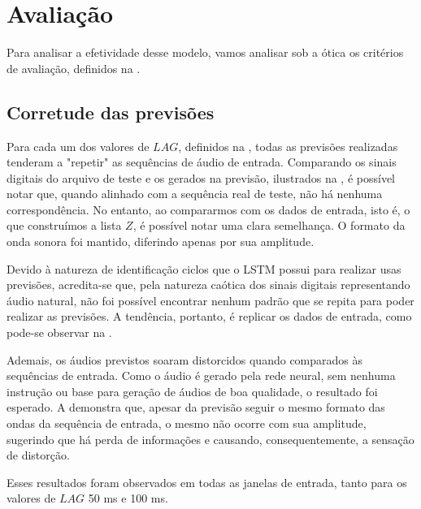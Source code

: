 \section{Avaliação}

Para analisar a efetividade desse modelo, vamos analisar sob a ótica os critérios de avaliação, definidos na .

\subsection{Corretude das previsões}

Para cada um dos valores de $LAG$, definidos na , todas as previsões realizadas tenderam a "repetir" as sequências de áudio de entrada. Comparando os sinais digitais do arquivo de teste e os gerados na previsão, ilustrados na , é possível notar que, quando alinhado com a sequência real de teste, não há nenhuma correspondência. No entanto, ao compararmos com os dados de entrada, isto é, o que construímos a lista $Z$, é possível notar uma clara semelhança. O formato da onda sonora foi mantido, diferindo apenas por sua amplitude.

Devido à natureza de identificação ciclos que o LSTM possui para realizar usas previsões, acredita-se que, pela natureza caótica dos sinais digitais representando áudio natural, não foi possível encontrar nenhum padrão que se repita para poder realizar as previsões. A tendência, portanto, é replicar os dados de entrada, como pode-se observar na .

Ademais, os áudios previstos soaram distorcidos quando comparados às sequências de entrada. Como o áudio é gerado pela rede neural, sem nenhuma instrução ou base para geração de áudios de boa qualidade, o resultado foi esperado. A  demonstra que, apesar da previsão seguir o mesmo formato das ondas da sequência de entrada, o mesmo não ocorre com sua amplitude, sugerindo que há perda de informações e causando, consequentemente, a sensação de distorção. 

Esses resultados foram observados em todas as janelas de entrada, tanto para os valores de $LAG$ 50 ms e 100 ms.

